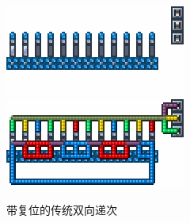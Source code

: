 \begin{figure}
    \centering
    \includegraphics{images/265.png}
    \qquad
    \includegraphics{images/266.png}
    \caption{带复位的传统双向递次}
\end{figure}
